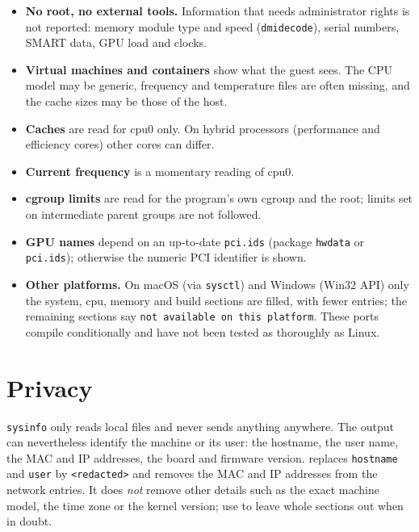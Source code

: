 \documentclass[11pt,a4paper]{article}
\newcommand{\cmd}[1]{\texttt{#1}}
\newcommand{\opt}[1]{\texttt{\detokenize{#1}}}
\newcommand{\prog}{\texttt{sysinfo}}
\begin{document}
\begin{itemize}
  \item \textbf{No root, no external tools.} Information that needs administrator rights is not reported:
        memory module type and speed (\cmd{dmidecode}), serial numbers, SMART data, GPU load and clocks.
  \item \textbf{Virtual machines and containers} show what the guest sees. The CPU model may be generic, frequency and
        temperature files are often missing, and the cache sizes may be those of the host.
  \item \textbf{Caches} are read for cpu0 only. On hybrid processors (performance and efficiency cores) other cores can differ.
  \item \textbf{Current frequency} is a momentary reading of cpu0.
  \item \textbf{cgroup limits} are read for the program's own cgroup and the root; limits set on intermediate parent groups
        are not followed.
  \item \textbf{GPU names} depend on an up-to-date \cmd{pci.ids} (package \texttt{hwdata} or \texttt{pci.ids}); otherwise the
        numeric PCI identifier is shown.
  \item \textbf{Other platforms.} On macOS (via \cmd{sysctl}) and Windows (Win32 API) only the system, cpu, memory and build
        sections are filled, with fewer entries; the remaining sections say \texttt{not available on this platform}. These
        ports compile conditionally and have not been tested as thoroughly as Linux.
\end{itemize}

\section{Privacy}
\label{sec:privacy}

\prog{} only reads local files and never sends anything anywhere. The output can nevertheless identify the machine or
its user: the hostname, the user name, the MAC and IP addresses, the board and firmware version.
\opt{--redact} replaces \texttt{hostname} and \texttt{user} by \texttt{<redacted>} and removes the MAC and IP addresses from the
network entries. It does \emph{not} remove other details such as the exact machine model, the time zone or the kernel version; use
\opt{-x network,environment,system} to leave whole sections out when in doubt.
\end{document}
